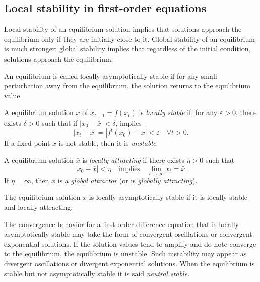 \subsection{Local stability in first-order equations}
Local stability of an equilibrium solution implies that solutions approach the equilibrium only if they are initially close to it. Global stability of an equilibrium is much stronger: global stability implies that regardless of the initial condition, solutions approach the equilibrium.

An equilibrium is called locally asymptotically stable if for any small perturbation away from the equilibrium, the solution returns to the equilibrium value.

\begin{definition}
A equilibrium solution $\bar x$ of $x_{t+1}=f(x_t)$ is \emph{locally stable} if, for any  $\varepsilon>0$, there exists $\delta>0$ such that if $|x_0-\bar x|<\delta$, implies $$|x_t- \bar x|=|f^t(x_0)-\bar x|<\varepsilon \quad \forall t>0.$$ If a fixed point $\bar x$ is not stable, then it is \emph{unstable}.
\end{definition}


\begin{definition}
A equilibrium solution $\bar x$ is \emph{locally attracting} if there exists $\eta>0$ such that
\[
|x_0-\bar x|<\eta\quad\textrm{implies}\quad \lim_{t\to\infty}x_t=\bar x.
\]
If $\eta=\infty$, then $\bar x$ is a \emph{global attractor} (or is \emph{globally attracting}).
\end{definition}

\begin{definition}
The equilibrium solution $\bar x$ is locally asymptotically stable if it is locally stable and locally attracting.
\end{definition}


The convergence behavior for a first-order difference equation that is locally asymptotically stable may take the form of convergent oscillations or convergent exponential solutions. If the solution values tend to amplify and do note converge to the equilibrium,  the equilibrium is unstable. Such instability may appear as divergent oscillations or divergent exponential solutions. When the equilibrium is stable but not asymptotically stable it is said \emph{neutral stable}.


